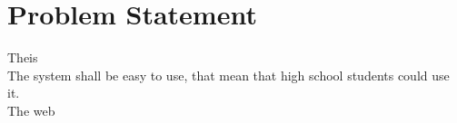 \section{Problem Statement}Theis\\
The system shall be easy to use, that mean that high school students could use it.\\
The web 